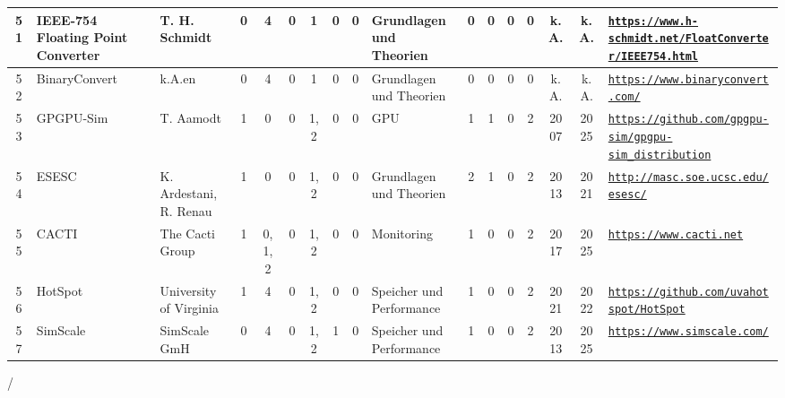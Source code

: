 \begin{landscape}
\begin{longtable}{|c|p{1cm}|p{1.3cm}|c|c|c|c|c|c|p{1.3cm}|c|c|c|c|c|c|p{2cm}|}
    51 & IEEE-754 Floating Point Converter & T. H. Schmidt & 0 & 4 & 0 & 1 & 0 & 0 & Grundlagen und Theorien & 0 & 0 & 0 & 0 & k.A. & k.A. & \href{https://www.h-schmidt.net/FloatConverter/IEEE754.html}{\nolinkurl{https://www.h-schmidt.net/FloatConverter/IEEE754.html}} \\ \hline
    52 & BinaryConvert & k.A.en & 0 & 4 & 0 & 1 & 0 & 0 & Grundlagen und Theorien & 0 & 0 & 0 & 0 & k.A. & k.A. & \href{https://www.binaryconvert.com/}{\nolinkurl{https://www.binaryconvert.com/}} \\ \hline
    53 & GPGPU-Sim & T. Aamodt & 1 & 0 & 0 & 1,2 & 0 & 0 & GPU & 1 & 1 & 0 & 2 & 2007 & 2025 & \href{https://github.com/gpgpu-sim/gpgpu-sim\_distribution}{\nolinkurl{https://github.com/gpgpu-sim/gpgpu-sim\_distribution}} \\ \hline
    54 & ESESC & K. Ardestani, R. Renau & 1 & 0 & 0 & 1,2 & 0 & 0 & Grundlagen und Theorien & 2 & 1 & 0 & 2 & 2013 & 2021 & \href{http://masc.soe.ucsc.edu/esesc/}{\nolinkurl{http://masc.soe.ucsc.edu/esesc/}} \\ \hline
    55 & CACTI & The Cacti Group & 1 & 0,1,2 & 0 & 1,2 & 0 & 0 & Monitoring & 1 & 0 & 0 & 2 & 2017 & 2025 & \href{https://www.cacti.net}{\nolinkurl{https://www.cacti.net}} \\ \hline
    56 & HotSpot & University of Virginia & 1 & 4 & 0 & 1,2 & 0 & 0 & Speicher und Performance & 1 & 0 & 0 & 2 & 2021 & 2022 & \href{https://github.com/uvahotspot/HotSpot}{\nolinkurl{https://github.com/uvahotspot/HotSpot}} \\ \hline
    57 & SimScale & SimScale GmH & 0 & 4 & 0 & 1,2 & 1 & 0 & Speicher und Performance & 1 & 0 & 0 & 2 & 2013 & 2025 & \href{https://www.simscale.com/}{\nolinkurl{https://www.simscale.com/}} \\ \hline     
\end{longtable}
\end{landscape}/
